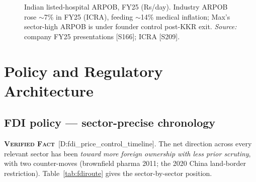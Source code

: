 \documentclass[11pt,a4paper]{article}
\newcommand{\VF}{\textcolor{vfcol}{\textsc{\textbf{Verified Fact}}}}
\newcommand{\cs}[1]{\textnormal{[#1]}}
\begin{document}
\begin{figure}[htbp]
\centering
{}
\caption{Indian listed-hospital ARPOB, FY25 (Rs/day). Industry ARPOB rose $\sim$7\% in FY25 (ICRA), feeding $\sim$14\% medical inflation; Max's sector-high ARPOB is under founder control post-KKR exit. \textit{Source:} company FY25 presentations \cs{S166}; ICRA \cs{S209}.}
\label{fig:ch12arpob}
\end{figure}

\section{Policy and Regulatory Architecture}\label{sec:policy}
\subsection{FDI policy --- sector-precise chronology}

\VF\ \cs{D:fdi\_price\_control\_timeline}. The net direction across every relevant sector has been \emph{toward more foreign ownership with less prior scrutiny}, with two counter-moves (brownfield pharma 2011; the 2020 China land-border restriction). Table~\ref{tab:fdiroute} gives the sector-by-sector position.
\end{document}
